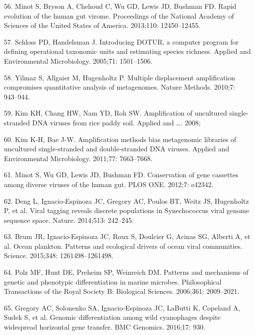 \documentclass[12pt,]{article}
\begin{document}
\hypertarget{ref-Minot:2013ih}{}
56. Minot S, Bryson A, Chehoud C, Wu GD, Lewis JD, Bushman FD. Rapid
evolution of the human gut virome. Proceedings of the National Academy
of Sciences of the United States of America. 2013;110: 12450--12455.

\hypertarget{ref-Schloss:2005hz}{}
57. Schloss PD, Handelsman J. Introducing DOTUR, a computer program for
defining operational taxonomic units and estimating species richness.
Applied and Environmental Microbiology. 2005;71: 1501--1506.

\hypertarget{ref-Yilmaz:2010jb}{}
58. Yilmaz S, Allgaier M, Hugenholtz P. Multiple displacement
amplification compromises quantitative analysis of metagenomes. Nature
Methods. 2010;7: 943--944.

\hypertarget{ref-Kim:2008to}{}
59. Kim KH, Chang HW, Nam YD, Roh SW. Amplification of uncultured
single-stranded DNA viruses from rice paddy soil. Applied and \ldots{}.
2008;

\hypertarget{ref-Kim:2011hp}{}
60. Kim K-H, Bae J-W. Amplification methods bias metagenomic libraries
of uncultured single-stranded and double-stranded DNA viruses. Applied
and Environmental Microbiology. 2011;77: 7663--7668.

\hypertarget{ref-Minot:2012ed}{}
61. Minot S, Wu GD, Lewis JD, Bushman FD. Conservation of gene cassettes
among diverse viruses of the human gut. PLOS ONE. 2012;7: e42342.

\hypertarget{ref-Deng:2014eb}{}
62. Deng L, Ignacio-Espinoza JC, Gregory AC, Poulos BT, Weitz JS,
Hugenholtz P, et al. Viral tagging reveals discrete populations in
Synechococcus viral genome sequence space. Nature. 2014;513: 242--245.

\hypertarget{ref-Brum:2015iaa}{}
63. Brum JR, Ignacio-Espinoza JC, Roux S, Doulcier G, Acinas SG, Alberti
A, et al. Ocean plankton. Patterns and ecological drivers of ocean viral
communities. Science. 2015;348: 1261498--1261498.

\hypertarget{ref-Polz:2006fi}{}
64. Polz MF, Hunt DE, Preheim SP, Weinreich DM. Patterns and mechanisms
of genetic and phenotypic differentiation in marine microbes.
Philosophical Transactions of the Royal Society B: Biological Sciences.
2006;361: 2009--2021.

\hypertarget{ref-Gregory:2016cg}{}
65. Gregory AC, Solonenko SA, Ignacio-Espinoza JC, LaButti K, Copeland
A, Sudek S, et al. Genomic differentiation among wild cyanophages
despite widespread horizontal gene transfer. BMC Genomics. 2016;17: 930.
\end{document}
